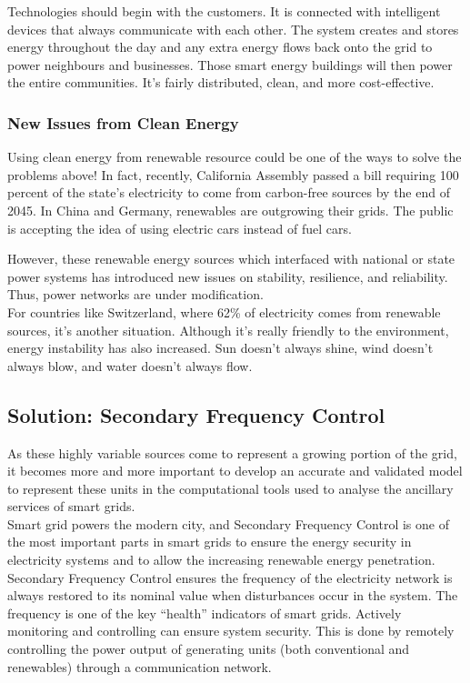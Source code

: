 Technologies should begin with the customers. It is connected with intelligent devices that always communicate with each other. The system creates and stores energy throughout the day and any extra energy flows back onto the grid to power neighbours and businesses. Those smart energy buildings will then power the entire communities. It’s fairly distributed, clean, and more cost-effective. 

\subsubsection{New Issues from Clean Energy}
Using clean energy from renewable resource could be one of the ways to solve the problems above! In fact, recently, California Assembly passed a bill requiring 100 percent of the state’s electricity to come from carbon-free sources by the end of 2045. In China and Germany, renewables are outgrowing their grids. The public is accepting the idea of using electric cars instead of fuel cars. 

However, these renewable energy sources which interfaced with national or state power systems has introduced new issues on stability, resilience, and reliability. Thus, power networks are under modification.\\

For countries like Switzerland, where 62\% of electricity comes from renewable sources, it’s another situation. Although it’s really friendly to the environment, energy instability has also increased. Sun doesn’t always shine, wind doesn’t always blow, and water doesn’t always flow. 

\subsection{Solution: Secondary Frequency Control}
As these highly variable sources come to represent a growing portion of the grid, it becomes more and more important to develop an accurate and validated model to represent these units in the computational tools used to analyse the ancillary services of smart grids.\\

Smart grid powers the modern city, and Secondary Frequency Control is one of the most important parts in smart grids to ensure the energy security in electricity systems and to allow the increasing renewable energy penetration. Secondary Frequency Control ensures the frequency of the electricity network is always restored to its nominal value when disturbances occur in the system. The frequency is one of the key “health” indicators of smart grids. Actively monitoring and controlling can ensure system security. This is done by remotely controlling the power output of generating units (both conventional and renewables) through a communication network. 